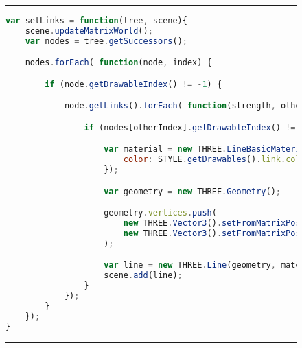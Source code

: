 \begin{figure}[H]
\noindent\rule{\textwidth}{1pt}
\begin{lstlisting}[language=JavaScript, caption= {Linking function for calls}, label={lst:callLinks}]
var setLinks = function(tree, scene){
    scene.updateMatrixWorld();
    var nodes = tree.getSuccessors();

    nodes.forEach( function(node, index) {

        if (node.getDrawableIndex() != -1) {

            node.getLinks().forEach( function(strength, otherIndex) {

                if (nodes[otherIndex].getDrawableIndex() != -1) {

                    var material = new THREE.LineBasicMaterial({
                        color: STYLE.getDrawables().link.color
                    });

                    var geometry = new THREE.Geometry();

                    geometry.vertices.push(
                        new THREE.Vector3().setFromMatrixPosition(drawables.get(node.getType())[node.getDrawableIndex()].getMesh().matrixWorld),
                        new THREE.Vector3().setFromMatrixPosition(drawables.get(nodes[otherIndex].getType())[nodes[otherIndex].getDrawableIndex()].getMesh().matrixWorld)
                    );

                    var line = new THREE.Line(geometry, material);
                    scene.add(line);
                }
            });
        }
    });
}
\end{lstlisting}
\noindent\rule{\textwidth}{1pt}
\end{figure}
